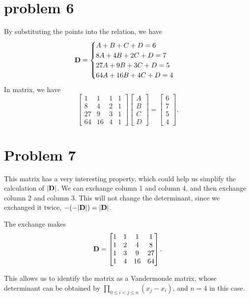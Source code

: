 \documentclass[12pt,a4paper]{article}
\begin{document}
\section*{problem 6}
\begin{solution}
    By substituting the points into the relation, we have
    \begin{equation}\label{w3cubiccoe}
        \mathbf{D} = \begin{cases}
            A + B + C + D = 6\\
            8A + 4B + 2C + D = 7\\
            27A + 9B + 3C + D = 5\\
            64A + 16B + 4C + D = 4
        \end{cases}
    \end{equation}
    In matrix, we have
    \[
\begin{bmatrix}
1 & 1 & 1 & 1 \\
8 & 4 & 2 & 1 \\
27 & 9 & 3 & 1 \\
64 & 16 & 4 & 1
\end{bmatrix}
\begin{bmatrix}
A \\
B \\
C \\
D
\end{bmatrix}
=
\begin{bmatrix}
6 \\
7 \\
5 \\
4
\end{bmatrix}.
\]

\section*{Problem 7}
This matrix has a very interesting property, which could help us simplify the calculation of \(|\mathbf{D}|\).
We can exchange column 1 and column 4, and then exchange column 2 and column 3. This will not change the determinant, since we exchanged it twice, \( -(-|\mathbf{D}|) = |\mathbf{D}| \).

The exchange makes
\[
\mathbf{D} = 
\begin{bmatrix}
1 & 1 & 1 & 1 \\
1 & 2 & 4 & 8 \\
1 & 3 & 9 & 27 \\
1 & 4 & 16 & 64
\end{bmatrix}.
\]

This allows us to identify the matrix as a Vandermonde matrix, whose determinant can be obtained by \( \prod_{0 \leq i < j \leq n} (x_j - x_i) \), and \( n = 4 \) in this case.


\end{solution}
\end{document}
